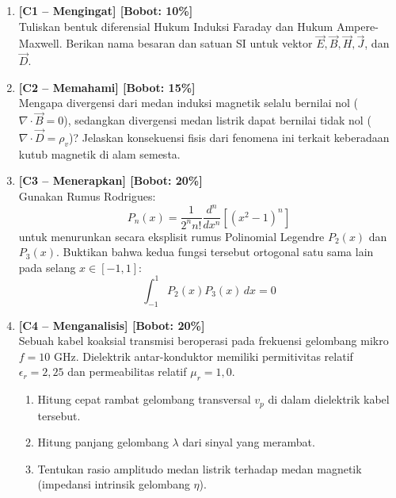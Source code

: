 \documentclass[11pt,a4paper]{article}
\theoremstyle{definition}
\begin{document}
\begin{enumerate}[leftmargin=*, label=\textbf{\arabic*.}]
    \item \textbf{[C1 -- Mengingat] [Bobot: 10\%]}\\
    Tuliskan bentuk diferensial Hukum Induksi Faraday dan Hukum Ampere-Maxwell. Berikan nama besaran dan satuan SI untuk vektor $\vec{E}, \vec{B}, \vec{H}, \vec{J}$, dan $\vec{D}$.

    \item \textbf{[C2 -- Memahami] [Bobot: 15\%]}\\
    Mengapa divergensi dari medan induksi magnetik selalu bernilai nol ($\nabla \cdot \vec{B} = 0$), sedangkan divergensi medan listrik dapat bernilai tidak nol ($\nabla \cdot \vec{D} = \rho_v$)? Jelaskan konsekuensi fisis dari fenomena ini terkait keberadaan kutub magnetik di alam semesta.

    \item \textbf{[C3 -- Menerapkan] [Bobot: 20\%]}\\
    Gunakan Rumus Rodrigues:
    \begin{equation*}
        P_n(x) = \frac{1}{2^n n!} \frac{d^n}{dx^n} \left[ (x^2 - 1)^n \right]
    \end{equation*}
    untuk menurunkan secara eksplisit rumus Polinomial Legendre $P_2(x)$ dan $P_3(x)$. Buktikan bahwa kedua fungsi tersebut ortogonal satu sama lain pada selang $x \in [-1, 1]$:
    \begin{equation*}
        \int_{-1}^{1} P_2(x) P_3(x) \, dx = 0
    \end{equation*}

    \item \textbf{[C4 -- Menganalisis] [Bobot: 20\%]}\\
    Sebuah kabel koaksial transmisi beroperasi pada frekuensi gelombang mikro $f = 10\text{ GHz}$. Dielektrik antar-konduktor memiliki permitivitas relatif $\epsilon_r = 2{,}25$ dan permeabilitas relatif $\mu_r = 1{,}0$.
    \begin{enumerate}[label=(\alph*)]
        \item Hitung cepat rambat gelombang transversal $v_p$ di dalam dielektrik kabel tersebut.
        \item Hitung panjang gelombang $\lambda$ dari sinyal yang merambat.
        \item Tentukan rasio amplitudo medan listrik terhadap medan magnetik (impedansi intrinsik gelombang $\eta$).
    \end{enumerate}


\end{enumerate}
\end{document}
